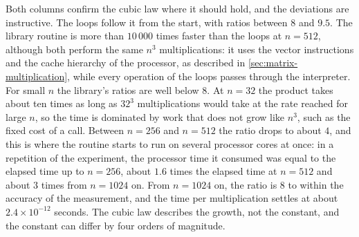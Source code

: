\begin{table}
\end{table}

Both columns confirm the cubic law where it should hold, and the deviations are instructive. The loops follow it from the start, with ratios between $8$ and $9.5$. The library routine is more than $10\,000$ times faster than the loops at $n=512$, although both perform the same $n^3$ multiplications: it uses the vector instructions and the cache hierarchy of the processor, as described in \cref{sec:matrix-multiplication}, while every operation of the loops passes through the interpreter. For small $n$ the library's ratios are well below $8$. At $n=32$ the product takes about ten times as long as $32^3$ multiplications would take at the rate reached for large $n$, so the time is dominated by work that does not grow like $n^3$, such as the fixed cost of a call. Between $n=256$ and $n=512$ the ratio drops to about $4$, and this is where the routine starts to run on several processor cores at once: in a repetition of the experiment, the processor time it consumed was equal to the elapsed time up to $n=256$, about $1.6$ times the elapsed time at $n=512$ and about $3$ times from $n=1024$ on. From $n=1024$ on, the ratio is $8$ to within the accuracy of the measurement, and the time per multiplication settles at about $2.4\times10^{-12}$ seconds. The cubic law describes the growth, not the constant, and the constant can differ by four orders of magnitude.

